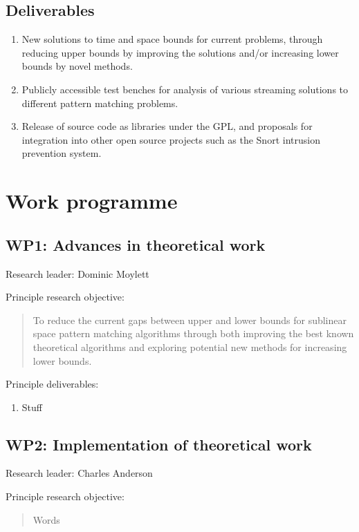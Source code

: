 \documentclass[a4paper,11pt]{article}
\begin{document}
    \subsection{Deliverables}

    \begin{enumerate}
        \item New solutions to time and space bounds for current problems, through reducing upper bounds by improving the solutions and/or increasing lower bounds by novel methods.
        \item Publicly accessible test benches for analysis of various streaming solutions to different pattern matching problems.
        \item Release of source code as libraries under the GPL, and proposals for integration into other open source projects such as the Snort intrusion prevention system.
    \end{enumerate}

    \section{Work programme}

    \subsection*{WP1: Advances in theoretical work}

    Research leader: Dominic Moylett

    Principle research objective:
    \begin{quote}
        To reduce the current gaps between upper and lower bounds for sublinear space pattern matching algorithms through both improving the best known theoretical algorithms and exploring potential new methods for increasing lower bounds.
    \end{quote}

    Principle deliverables:
    \begin{enumerate}
        \item Stuff
    \end{enumerate}

    \subsection*{WP2: Implementation of theoretical work}

    Research leader: Charles Anderson

    Principle research objective:
    \begin{quote}
        Words
    \end{quote}
\end{document}
